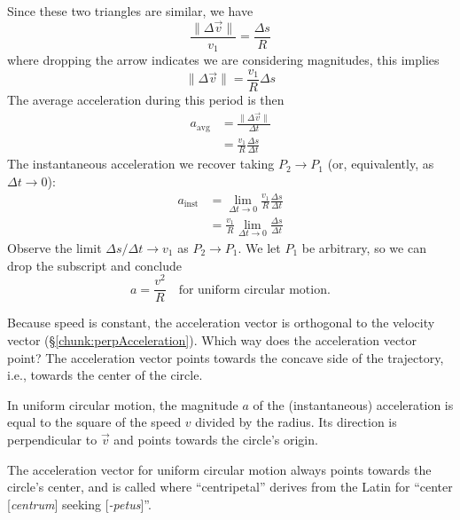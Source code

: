 Since these two triangles are similar, we have
\begin{equation}
\frac{\|\Delta\vec{v}\|}{v_{1}}=\frac{\Delta s}{R}
\end{equation}
where dropping the arrow indicates we are considering magnitudes, this
implies
\begin{equation}
\|\Delta\vec{v}\| = \frac{v_{1}}{R}\Delta s
\end{equation}
The average acceleration during this period is then
\begin{equation}
\begin{split}
a_{\text{avg}}&=\frac{\|\Delta\vec{v}\|}{\Delta t}\\
&=\frac{v_{1}}{R}\frac{\Delta s}{\Delta t}
\end{split}
\end{equation}
The instantaneous acceleration we recover taking $P_{2}\to P_{1}$ (or,
equivalently, as $\Delta t\to0$):
\begin{equation}
\begin{split}
a_{\text{inst}} &= \lim_{\Delta t\to0}\frac{v_{1}}{R}\frac{\Delta s}{\Delta t}\\
&=\frac{v_{1}}{R}\lim_{\Delta t\to0}\frac{\Delta s}{\Delta t}
\end{split}
\end{equation}
Observe the limit $\Delta s/\Delta t\to v_{1}$ as $P_{2}\to P_{1}$. We
let $P_{1}$ be arbitrary, so we can drop the subscript and conclude
\begin{equation}
a = \frac{v^{2}}{R}\quad\mbox{for uniform circular motion}.
\end{equation}

Because speed is constant, the acceleration vector is orthogonal to the
velocity vector (\S\ref{chunk:perpAcceleration}). Which way does
the acceleration vector point? The acceleration vector points towards
the concave side of the trajectory, i.e., towards the center of the
circle.

In uniform circular motion, the magnitude $a$ of the (instantaneous)
acceleration is equal to the square of the speed $v$ divided by the
radius. Its direction is perpendicular to $\vec{v}$ and points towards
the circle's origin.

The acceleration vector for uniform circular motion always points
towards the circle's center, and is called  
where ``centripetal'' derives from the Latin for ``center
[\emph{centrum}] seeking [\emph{-petus}]''.

